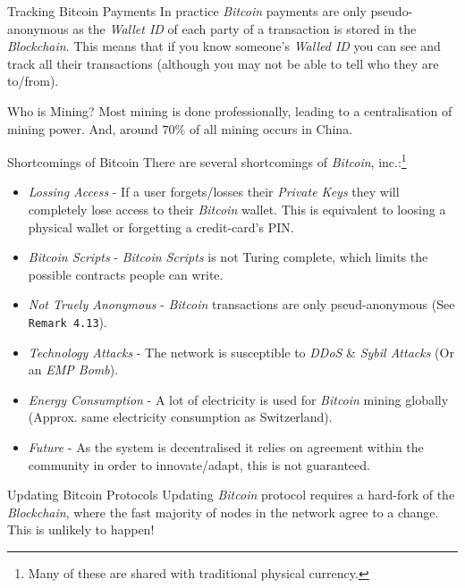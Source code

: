 \documentclass[11pt,a4paper]{article}
\begin{document}
  \begin{remark}{Tracking Bitcoin Payments}
    In practice \textit{Bitcoin} payments are only pseudo-anonymous as the \textit{Wallet ID} of each party of a transaction is stored in the \textit{Blockchain}. This means that if you know someone's \textit{Walled ID} you can see and track all their transactions (although you may not be able to tell who they are to/from).
  \end{remark}

  \begin{remark}{Who is Mining?}
    Most mining is done professionally, leading to a centralisation of mining power. And, around $70\%$ of all mining occurs in China.
  \end{remark}

  \begin{remark}{Shortcomings of Bitcoin}
    There are several shortcomings of \textit{Bitcoin}, inc.:\footnote{Many of these are shared with traditional physical currency.}
    \begin{itemize}
      \item \textit{Lossing Access} - If a user forgets/losses their \textit{Private Keys} they will completely lose access to their \textit{Bitcoin} wallet. This is equivalent to loosing a physical wallet or forgetting a credit-card's PIN.
      \item \textit{Bitcoin Scripts} - \textit{Bitcoin Scripts} is not Turing complete, which limits the possible contracts people can write.
      \item \textit{Not Truely Anonymous} - \textit{Bitcoin} transactions are only pseud-anonymous (See \texttt{Remark 4.13}).
      \item \textit{Technology Attacks} - The network is susceptible to \textit{DDoS} \& \textit{Sybil Attacks} (Or an \textit{EMP Bomb}).
      \item \textit{Energy Consumption} - A lot of electricity is used for \textit{Bitcoin} mining globally (Approx. same electricity consumption as Switzerland).
      \item \textit{Future} - As the system is decentralised it relies on agreement within the community in order to innovate/adapt, this is not guaranteed.
    \end{itemize}
  \end{remark}

  \begin{remark}{Updating Bitcoin Protocols}
    Updating \textit{Bitcoin} protocol requires a hard-fork of the \textit{Blockchain}, where the fast majority of nodes in the network agree to a change. This is unlikely to happen!
  \end{remark}
\end{document}

